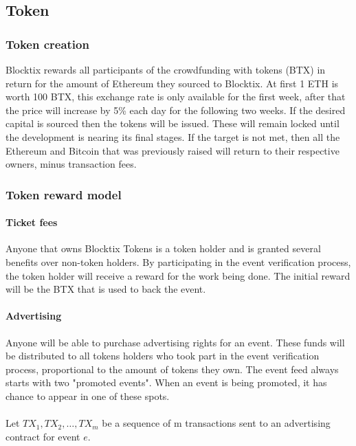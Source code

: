 \documentclass[a4paper]{article}
\begin{document}
\subsection{Token}
\subsubsection{Token creation}
Blocktix rewards all participants of the crowdfunding with tokens (BTX) in return for the amount of Ethereum they sourced to Blocktix. At first 1 ETH is worth 100 BTX, this exchange rate is only available for the first week, after that the price will increase by 5\% each day for the following two weeks. If the desired capital is sourced then the tokens will be issued. These will remain locked until the development is nearing its final stages. If the target is not met, then all the Ethereum and Bitcoin that was previously raised will return to their respective owners, minus transaction fees.

\subsubsection{Token reward model}
\paragraph{Ticket fees}
Anyone that owns Blocktix Tokens is a token holder and is granted several benefits over non-token holders.
By participating in the event verification process, the token holder will receive a reward for the work being done. The initial reward will be the BTX that is used to back the event.

\paragraph{Advertising}
Anyone will be able to purchase advertising rights for an event. These funds will be distributed to all tokens holders who took part in the event verification process, proportional to the amount of tokens they own. The event feed always starts with two "promoted events". When an event is being promoted, it has chance to appear in one of these spots.

\paragraph{} Let $TX_1, TX_2, \ldots, TX_m$ be a sequence of m transactions sent to an advertising contract for event $e$.
\end{document}
